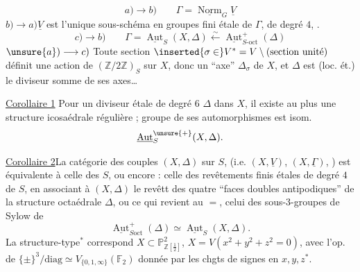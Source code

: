 \[
 a)\longrightarrow b)\qquad \Gamma=\underline{\operatorname{Norm}}_G\underline V
\]
$b)\longrightarrow a)$\quad $\underline V$ est l'unique sous-schéma en groupes  fini étale de $\Gamma$,  de degré $4$, .
\[
 c)\longrightarrow b)\qquad
 \Gamma=\underline{\operatorname{Aut}}_S(X,\Delta)\xleftarrow{\sim}\underline{\operatorname{Aut}}^+_{S\text{-}\mathrm{oct}}(\Delta)
\]
$\unsure{a})\longrightarrow c)$\quad {} Toute section $\inserted{\sigma\in}V^*=V\setminus(\text{section unité})$ définit une action  de  $(\mathbb Z/2\mathbb Z)_S$ sur $X$, donc un ``axe'' $\Delta_\sigma$ de $X$, et $\Delta$ est  (loc. ét.) le  diviseur somme de ses axes\ldots

\uline{Corollaire 1} Pour un diviseur étale de degré $6$ $\Delta$ dans $X$, il existe au plus une structure icosaédrale régulière ;    groupe de ses automorphismes  est isom.
\[
\underline{\operatorname{Aut}}_S^{\unsure{+}}(X,\Delta).
\]

\uline{Corollaire 2}\quad La catégorie des couples $(X,\Delta)$  sur $S$, (i.e. $(X,\underline V)$,  $(X,\underline\Gamma)$, ) est équivalente à celle des  $S$, ou encore : celle des revêtements finis étales \deleted{$\unsure{\Delta}$}  de degré $4$ de $S$, en associant à  $(X,\Delta)$ le revêtt des quatre ``faces doubles antipodiques'' de la structure octaédrale $\Delta$, ou ce qui revient au $=$, celui des sous-$3$-groupes de Sylow de 
\[
\underline{\operatorname{Aut}}^+_{S\mathrm{oct}}(\Delta)\simeq\underline{\operatorname{Aut}}_S(X,\Delta).
\]
La structure-type${}^*$ correspond  $X\subset\mathbb P^2_{\mathbb Z[\frac12]}$, $X=V(x^2+y^2+z^2=0)$, avec l'op. de  $\{\pm\}^3/\mathrm{diag}\simeq V_{\{0,1,\infty\}}(\mathbb F_2)$ donnée par les chgts de signes en $x,y,z$${}^*$.

